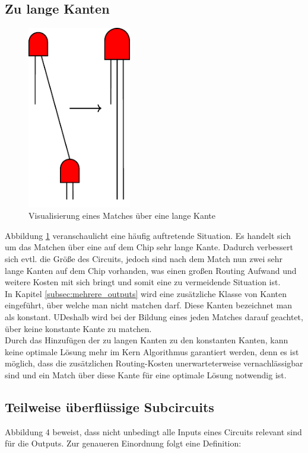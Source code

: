 \documentclass[11pt, a4paper, german]{article}
\begin{document}
\newpage
\subsection{Zu lange Kanten}
\label{subsec:zu_lange_kanten}
 \begin{figure}
		\includegraphics[height = 8cm]{pictures/compiled/zu_lange_kante}
		\caption{Visualisierung eines Matches über eine lange Kante}
		\label{bild:zu_lange_kanten}
\end{figure}
Abbildung \ref{bild:zu_lange_kanten} veranschaulicht eine häufig auftretende Situation. Es handelt sich um das Matchen über eine auf dem Chip sehr lange Kante. Dadurch verbessert sich evtl. die Größe des Circuits, jedoch sind nach dem Match nun zwei sehr lange Kanten auf dem Chip vorhanden, was   einen großen Routing Aufwand und weitere Kosten mit sich bringt und somit eine zu vermeidende Situation ist. \\
In Kapitel \ref{subsec:mehrere_outputs} wird eine zusätzliche Klasse von Kanten eingeführt, über welche man nicht matchen darf.
Diese Kanten bezeichnet man als konstant.
UDeshalb wird bei der Bildung eines jeden Matches darauf geachtet, über keine konstante Kante zu matchen.\\
Durch das Hinzufügen der zu langen Kanten zu den konstanten Kanten, kann keine optimale Lösung mehr im Kern Algorithmus garantiert werden, denn es ist möglich, dass die zusätzlichen Routing-Kosten unerwarteterweise vernachlässigbar sind und ein Match über diese Kante für eine optimale Lösung notwendig ist. \\

 \subsection{Teilweise überflüssige Subcircuits}
 \label{subsec:teilweise_ueberfkl_subcircuits}
 Abbildung 4 beweist, dass nicht unbedingt alle Inputs eines Circuits relevant sind für die Outputs. Zur genaueren Einordnung folgt eine Definition:\\
 
\end{document}
